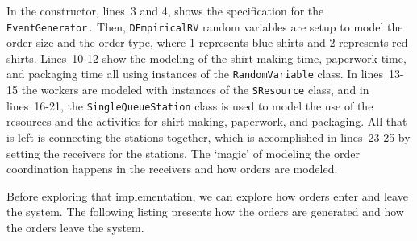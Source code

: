 \documentclass[
]{book}
\theoremstyle{definition}
\theoremstyle{definition}
\theoremstyle{definition}
\theoremstyle{definition}
\theoremstyle{remark}
\begin{document}
In the constructor, lines~3 and 4, shows the
specification for the \texttt{EventGenerator.} Then, \texttt{DEmpiricalRV} random
variables are setup to model the order size and the order type, where 1
represents blue shirts and 2 represents red shirts. Lines~10-12 show the
modeling of the shirt making time, paperwork time, and packaging time
all using instances of the \texttt{RandomVariable} class. In lines~13-15 the
workers are modeled with instances of the \texttt{SResource} class, and in
lines~16-21, the \texttt{SingleQueueStation} class is used to model the use of
the resources and the activities for shirt making, paperwork, and
packaging. All that is left is connecting the stations together, which
is accomplished in lines~23-25 by setting the receivers for the
stations. The `magic' of modeling the order coordination happens in the
receivers and how orders are modeled.

Before exploring that implementation, we can explore how orders enter
and leave the system. The following listing presents how the orders are generated and how
the orders leave the system.
\end{document}
